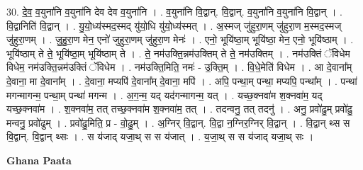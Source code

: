 \documentclass[17pt]{extarticle}
\begin{document}
30. दे॒व॒ व॒युना॑नि व॒युना॑नि देव देव व॒युना॑नि । . व॒युना॑नि वि॒द्वान्. वि॒द्वान्. व॒युना॑नि व॒युना॑नि वि॒द्वान् । . वि॒द्वानिति॑ वि॒द्वान् । . यु॒यो॒ध्य॑स्मद॒स्मद् यु॑यो॒धि यु॑यो॒ध्य॑स्मत् । . अ॒स्मज् जु॑हुरा॒णम् जु॑हुरा॒ण म॒स्मद॒स्मज् जु॑हुरा॒णम् । . जु॒हु॒रा॒ण मेन॒ एनो॑ जुहुरा॒णम् जु॑हुरा॒ण मेनः॑ । . एनो॒ भूयि॑ष्ठा॒म् भूयि॑ष्ठा॒ मेन॒ एनो॒ भूयि॑ष्ठाम् । . भूयि॑ष्ठाम् ते ते॒ भूयि॑ष्ठा॒म् भूयि॑ष्ठाम् ते । . ते॒ नम॑उक्ति॒न्नम॑उक्तिम् ते ते॒ नम॑उक्तिम् । . नम॑उक्तिं ॅविधेम विधेम॒ नम॑उक्ति॒न्नम॑उक्तिं ॅविधेम । . नम॑उक्ति॒मिति॒ नमः॑ - उ॒क्ति॒म् । . वि॒धे॒मेति॑ विधेम । . आ दे॒वाना᳚म् दे॒वाना॒ मा दे॒वाना᳚म् । . दे॒वाना॒ मप्यपि॑ दे॒वाना᳚म् दे॒वाना॒ मपि॑ । . अपि॒ पन्था॒म् पन्था॒ मप्यपि॒ पन्था᳚म् । . पन्था॑ मगन्मागन्म॒ पन्था॒म् पन्था॑ मगन्म । . अ॒ग॒न्म॒ यद् यद॑गन्मागन्म॒ यत् । . यच्छ॒क्नवा॑म श॒क्नवा॑म॒ यद् यच्छ॒क्नवा॑म । . श॒क्नवा॑म॒ तत् तच्छ॒क्नवा॑म श॒क्नवा॑म॒ तत् । . तदन्वनु॒ तत् तदनु॑ । . अनु॒ प्रवो॑ढु॒म् प्रवो॑ढु॒ मन्वनु॒ प्रवो॑ढुम् । . प्रवो॑ढु॒मिति॒ प्र - वो॒ढु॒म् । . अ॒ग्निर् वि॒द्वान्. वि॒द्वा न॒ग्निर॒ग्निर् वि॒द्वान् । . वि॒द्वान् थ्स स वि॒द्वान्. वि॒द्वान् थ्सः । . स य॑जाद् यजा॒थ् स स य॑जात् । . य॒जा॒थ् स स य॑जाद् यजा॒थ् सः । \newline

\textbf{Ghana Paata } \newline
\end{document}
